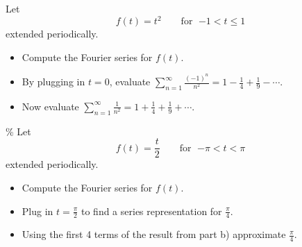 \documentclass{ximera}
\begin{document}
\begin{exercise}
    Let
    \begin{equation*}
        f(t) = t^2 \qquad \text{for } \; {-1} < t \leq 1
    \end{equation*}
    extended periodically.
    \begin{itemize}
        \item Compute the Fourier series for $f(t)$.
        \item By plugging in $t=0$, evaluate $\displaystyle \sum_{n=1}^\infty \frac{{(-1)}^n}{n^2} = 1 - \frac{1}{4} + \frac{1}{9} - \cdots$.
        \item Now evaluate $\displaystyle \sum_{n=1}^\infty \frac{1}{n^2} = 1 + \frac{1}{4} + \frac{1}{9} + \cdots$.
    \end{itemize}
\end{exercise}

\begin{exercise}\%
    Let
    \begin{equation*}
        f(t) = \frac{t}{2} \qquad \text{for } \; {-\pi} < t < \pi
    \end{equation*}
    extended periodically.
    \begin{itemize}
        \item Compute the Fourier series for $f(t)$.
        \item Plug in $t=\frac{\pi}{2}$ to find a series representation for $\frac{\pi}{4}$.
        \item Using the first 4 terms of the result from part b) approximate $\frac{\pi}{4}$.
    \end{itemize}
\end{exercise}
\end{document}
